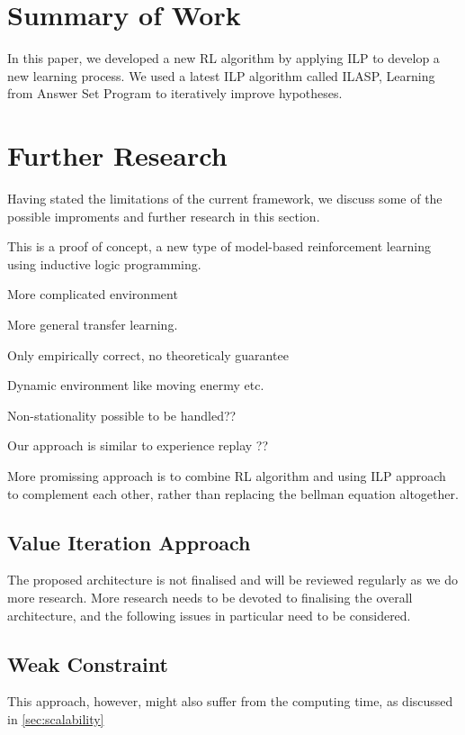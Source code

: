 \section{Summary of Work}
\label{sec:summary_of_work}

In this paper, we developed a new RL algorithm by applying ILP to develop a new learning process.
We used a latest ILP algorithm called ILASP, Learning from Answer Set Program to iteratively improve hypotheses.

\section{Further Research}
\label{sec:further_research}

Having stated the limitations of the current framework, we discuss some of the possible improments and further research in this section.

This is a proof of concept, a new type of model-based reinforcement learning using inductive logic programming. 

More complicated environment

More general transfer learning.

Only empirically correct, no theoreticaly guarantee

Dynamic environment like moving enermy etc.

Non-stationality possible to be handled??

Our approach is similar to experience replay ??

More promissing approach is to combine RL algorithm and using ILP approach to complement each other, rather than replacing the bellman equation altogether. 

\subsection{Value Iteration Approach}

The proposed architecture is not finalised and will be reviewed regularly as we do more research.
More research needs to be devoted to finalising the overall architecture, and the following issues in particular need to be considered.

\subsection{Weak Constraint}

This approach, however, might also suffer from the computing time, as discussed in \ref{sec:scalability}

